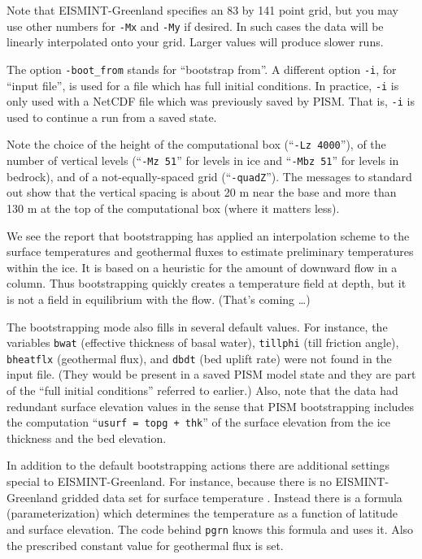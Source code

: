 \documentclass[11pt,final]{amsart}
\begin{document}
Note that EISMINT-Greenland specifies an 83 by 141 point grid, but you may use other numbers for \verb|-Mx| and \verb|-My| if desired.  In such cases the data will be linearly interpolated onto your grid.  Larger values will produce slower runs.

The option \verb|-boot_from| stands for ``bootstrap from''.  A different option \verb|-i|, for ``input file'', is used for a file which has full initial conditions.  In practice, \verb|-i| is only used with a NetCDF file which was previously saved by PISM.  That is, \verb|-i| is used to continue a run from a saved state.

Note the choice of the height of the computational box (``\verb|-Lz 4000|''), of the number of vertical levels (``\verb|-Mz 51|'' for levels in ice and ``\verb|-Mbz 51|'' for levels in bedrock), and of a not-equally-spaced grid (``\verb|-quadZ|'').  The messages to standard out show that the vertical spacing is about 20 m near the base and more than 130 m at the top of the computational box (where it matters less).

We see the report that bootstrapping has applied an interpolation scheme to the surface temperatures and geothermal fluxes to estimate preliminary temperatures within the ice.  It is based on a heuristic for the amount of downward flow in a column.  Thus bootstrapping quickly creates a temperature field at depth, but it is not a field in equilibrium with the flow.  (That's coming \dots)

The bootstrapping mode also fills in several default values.  For instance, the variables \verb|bwat| (effective thickness of basal water), \verb|tillphi| (till friction angle), \verb|bheatflx| (geothermal flux), and \verb|dbdt| (bed uplift rate) were not found in the input file.   (They would be present in a saved PISM model state and they are part of the ``full initial conditions'' referred to earlier.)  Also, note that the data had redundant surface elevation values in the sense that PISM bootstrapping includes the computation ``\verb|usurf = topg + thk|'' of the surface elevation from the ice thickness and the bed elevation.

In addition to the default bootstrapping actions there are additional settings special to EISMINT-Greenland.  For instance, because there is no EISMINT-Greenland gridded data set for surface temperature \cite{RitzEISMINT}.  Instead there is a formula (parameterization) which determines the temperature as a function of latitude and surface elevation.  The code behind \verb|pgrn| knows this formula and uses it.  Also the prescribed constant value for geothermal flux is set.
\end{document}
